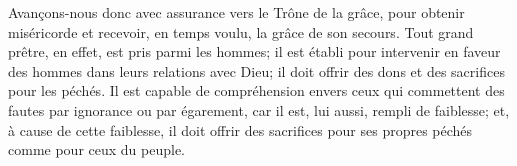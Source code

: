Avançons-nous donc avec assurance vers le Trône de la grâce,
	pour obtenir miséricorde et recevoir, en temps voulu,
		la grâce de son secours.
Tout grand prêtre, en effet, est pris parmi les hommes;
	il est établi pour intervenir en faveur des hommes
		dans leurs relations avec Dieu;
	il doit offrir des dons et des sacrifices pour les péchés.
Il est capable de compréhension
		envers ceux qui commettent des fautes par ignorance ou par égarement,
	car il est, lui aussi, rempli de faiblesse;
	et, à cause de cette faiblesse, il doit offrir des sacrifices
	pour ses propres péchés comme pour ceux du peuple.

